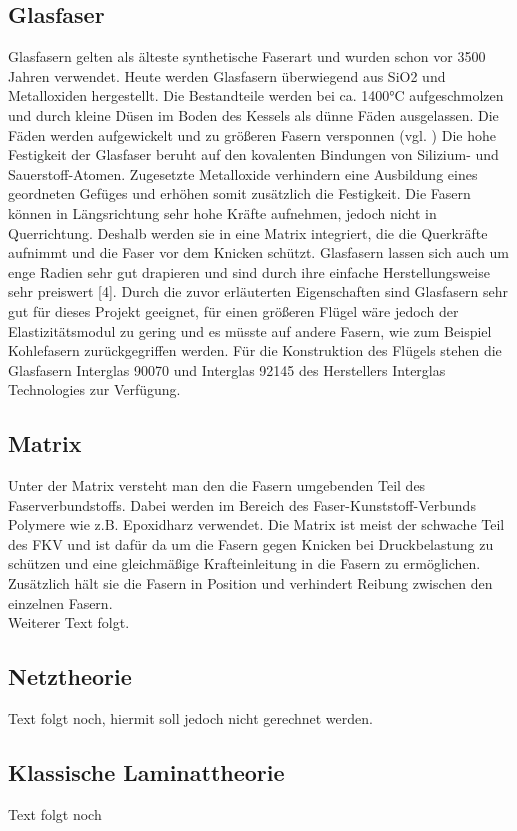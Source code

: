 \subsection{Glasfaser}
Glasfasern gelten als älteste synthetische Faserart und wurden schon vor 3500 Jahren verwendet. Heute werden Glasfasern überwiegend aus SiO2 und Metalloxiden hergestellt. Die Bestandteile werden bei ca. 1400°C aufgeschmolzen und durch kleine Düsen im Boden des Kessels als dünne Fäden ausgelassen. Die Fäden werden aufgewickelt und zu größeren Fasern versponnen (vgl. \cite{item3})
Die hohe Festigkeit der Glasfaser beruht auf den kovalenten Bindungen von Silizium- und Sauerstoff-Atomen. Zugesetzte Metalloxide verhindern eine Ausbildung eines geordneten Gefüges und erhöhen somit zusätzlich die Festigkeit. Die Fasern können in Längsrichtung sehr hohe Kräfte aufnehmen, jedoch nicht in Querrichtung. Deshalb werden sie in eine Matrix integriert, die die Querkräfte aufnimmt und die Faser vor dem Knicken schützt. Glasfasern lassen sich auch um enge Radien sehr gut drapieren und sind durch ihre einfache Herstellungsweise sehr preiswert [4].
Durch die zuvor erläuterten Eigenschaften sind Glasfasern sehr gut für dieses Projekt geeignet, für einen größeren Flügel wäre jedoch der Elastizitätsmodul zu gering und es müsste auf andere Fasern, wie zum Beispiel Kohlefasern zurückgegriffen werden. 
Für die Konstruktion des Flügels stehen die Glasfasern Interglas 90070 und Interglas 92145 des Herstellers Interglas Technologies zur Verfügung. 

\subsection{Matrix}
Unter der Matrix versteht man den die Fasern umgebenden Teil des Faserverbundstoffs. Dabei werden im Bereich des Faser-Kunststoff-Verbunds Polymere wie z.B. Epoxidharz verwendet. Die Matrix ist meist der schwache Teil des FKV und ist dafür da um die Fasern gegen Knicken bei Druckbelastung zu schützen und eine gleichmäßige Krafteinleitung in die Fasern zu ermöglichen. Zusätzlich hält sie die Fasern in Position und verhindert Reibung zwischen den einzelnen Fasern.\\  Weiterer Text folgt.
\subsection{Netztheorie}
Text folgt noch, hiermit soll jedoch nicht gerechnet werden.
\subsection{Klassische Laminattheorie}
Text folgt noch
